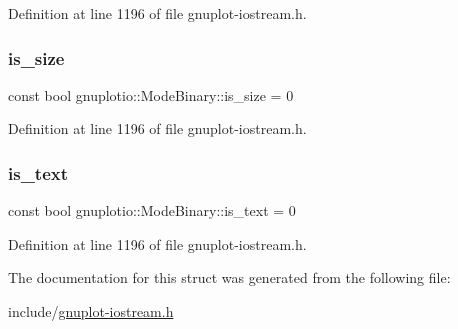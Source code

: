 Definition at line 1196 of file gnuplot-\/iostream.\+h.

\mbox{\label{structgnuplotio_1_1_mode_binary_a6eae25ea662362bbb88bc987d6025290}} 
\subsubsection{\texorpdfstring{is\+\_\+size}{is\_size}}
{\footnotesize\ttfamily const bool gnuplotio\+::\+Mode\+Binary\+::is\+\_\+size = 0\hspace{0.3cm}{\ttfamily [static]}}



Definition at line 1196 of file gnuplot-\/iostream.\+h.

\mbox{\label{structgnuplotio_1_1_mode_binary_ac89064b5df24f7ef4d765fdfde4fd1b6}} 
\subsubsection{\texorpdfstring{is\+\_\+text}{is\_text}}
{\footnotesize\ttfamily const bool gnuplotio\+::\+Mode\+Binary\+::is\+\_\+text = 0\hspace{0.3cm}{\ttfamily [static]}}



Definition at line 1196 of file gnuplot-\/iostream.\+h.



The documentation for this struct was generated from the following file\+:\begin{DoxyCompactItemize}
\item 
include/\hyperlink{gnuplot-iostream_8h}{gnuplot-\/iostream.\+h}\end{DoxyCompactItemize}
